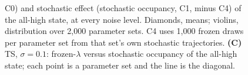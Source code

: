 \documentclass[11pt]{article}
\providecommand{\DIFaddtex}[1]{{\protect\color{red}#1}} %
\providecommand{\DIFdeltex}[1]{} %
\providecommand{\DIFaddFL}[1]{\DIFadd{#1}} %
\providecommand{\DIFdelFL}[1]{\DIFdel{#1}} %
\providecommand{\DIFaddbeginFL}{} %
\providecommand{\DIFaddendFL}{} %
\providecommand{\DIFdelbeginFL}{} %
\providecommand{\DIFdelendFL}{} %
\providecommand{\DIFadd}[1]{\texorpdfstring{\DIFaddtex{#1}}{#1}} %
\providecommand{\DIFdel}[1]{\texorpdfstring{\DIFdeltex{#1}}{}} %
\providecommand{\DIFaddincludegraphics}[2][]{\DIFOincludegraphics[#1]{#2}} %
\providecommand{\DIFdelincludegraphics}[2][]{}
\DeclareRobustCommand{\DIFaddbeginFL}{\DIFOaddbeginFL \let\includegraphics\DIFaddincludegraphics} %
\DeclareRobustCommand{\DIFaddendFL}{\DIFOaddendFL \let\includegraphics\DIFOincludegraphics} %
\DeclareRobustCommand{\DIFdelbeginFL}{\DIFOdelbeginFL \let\includegraphics\DIFdelincludegraphics} %
\DeclareRobustCommand{\DIFdelendFL}{\DIFOaddendFL \let\includegraphics\DIFOincludegraphics} %
\begin{document}
\begin{figure}
{\DIFdelFL{(i}\DIFdelendFL \DIFaddbeginFL \DIFaddFL{C0}\DIFaddendFL ) \DIFdelbeginFL \DIFdelFL{Same as B, but for Stochastic }\DIFdelendFL \DIFaddbeginFL \DIFaddFL{and stochastic }\DIFaddendFL effect (stochastic \DIFdelbeginFL \DIFdelFL{MRT }\DIFdelendFL \DIFaddbeginFL \DIFaddFL{occupancy, C1, }\DIFaddendFL minus \DIFdelbeginFL \DIFdelFL{resampled-$\lambda$ deterministic MRT}\DIFdelendFL \DIFaddbeginFL \DIFaddFL{C4}\DIFaddendFL ) \DIFdelbeginFL \DIFdelFL{. (ii) Scatter plot }\DIFdelendFL of \DIFdelbeginFL \DIFdelFL{resampled-$\lambda$ deterministic vs.\ stochastic MRT of }\DIFdelendFL the all-high state\DIFaddbeginFL \DIFaddFL{, }\DIFaddendFL at \DIFdelbeginFL \DIFdelFL{$\sigma = 0.1$}\DIFdelendFL \DIFaddbeginFL \DIFaddFL{every noise level. Diamonds}\DIFaddendFL , \DIFdelbeginFL \DIFdelFL{for TS and TT}\DIFdelendFL \DIFaddbeginFL \DIFaddFL{means; violins}\DIFaddendFL , \DIFdelbeginFL \DIFdelFL{illustrating the underlying sigmoidal relationship the violin}\DIFdelendFL \DIFaddbeginFL \DIFaddFL{distribution over 2}{\DIFaddFL{,}}\DIFaddFL{000 parameter sets. C4 uses 1}{\DIFaddFL{,}}\DIFaddFL{000 frozen draws per parameter set from that set}\DIFaddendFL 's \DIFdelbeginFL \DIFdelFL{signed difference alone does not show}\DIFdelendFL \DIFaddbeginFL \DIFaddFL{own stochastic trajectories}\DIFaddendFL .
    \DIFdelbeginFL \DIFdelFL{Each }\DIFdelendFL \DIFaddbeginFL \textbf{\DIFaddFL{(C)}} \DIFaddFL{TS, $\sigma = 0.1$: frozen-$\lambda$ versus stochastic occupancy of the all-high state; each }\DIFaddendFL point is a parameter set \DIFaddbeginFL \DIFaddFL{and the line is the diagonal}\DIFaddendFL .
}
\end{figure}
\end{document}
